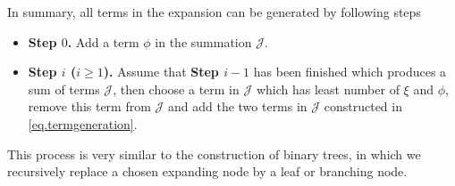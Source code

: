 In summary, all terms in the expansion can be generated by following steps

\begin{itemize}
    \item \textbf{Step $0$.} Add a term $\phi$ in the summation $\mathcal{J}$.
    \item \textbf{Step $i$ ($i\ge 1$).} Assume that \textbf{Step $i-1$} has been finished which produces a sum of terms $\mathcal{J}$, then choose a term in $\mathcal{J}$ which has least number of $\xi$ and $\phi$, remove this term from $\mathcal{J}$ and add the two terms in $\mathcal{J}$ constructed in \eqref{eq.termgeneration}.
\end{itemize}

This process is very similar to the construction of binary trees, in which we recursively replace a chosen expanding node by a leaf or branching node.

